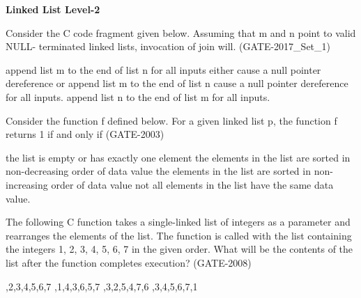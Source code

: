 
\centerline{\textbf{ \LARGE Linked List Level-2}}


\begin{questyle}
  \question  Consider the C code fragment given below. Assuming that m and n point to valid NULL- terminated linked
            lists, invocation of join will. (GATE-2017\_Set\_1)

    

  \begin{choices}
    \choice         append list m to the end of list n for all inputs
    \CorrectChoice  either cause a null pointer dereference or append list m to the end of list n
    \choice         cause a null pointer dereference for all inputs.
    \choice         append list n to the end of list m for all inputs.
  \end{choices}
\end{questyle}


\begin{questyle}
  \question  Consider the function f defined below. For a given linked list p, the function f returns 1 if and only if  (GATE-2003)
            
  \begin{choices}
    \choice         the list is empty or has exactly one element
    \CorrectChoice  the elements in the list are sorted in non-decreasing order of data value
    \choice         the elements in the list are sorted in non-increasing order of data value
    \choice         not all elements in the list have the same data value.
  \end{choices}
\end{questyle}


\begin{questyle}
  \question  The following C function takes a single-linked list of integers as a parameter and rearranges
            the elements of the list. The function is called with the list containing the integers 1, 2, 3, 4, 5, 6, 7
            in the given order. What will be the contents of the list after the function completes execution?  (GATE-2008)
            
  \begin{choices}
    ,2,3,4,5,6,7
    ,1,4,3,6,5,7
    ,3,2,5,4,7,6
    ,3,4,5,6,7,1
  \end{choices}
\end{questyle}


